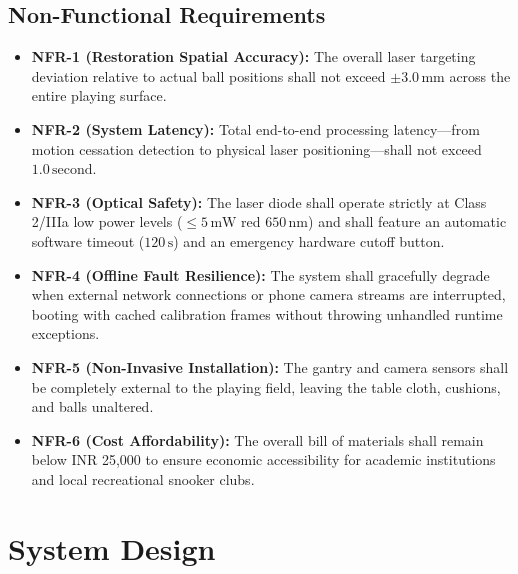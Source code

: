 \subsection{Non-Functional Requirements}
\begin{itemize}
    \item \textbf{NFR-1 (Restoration Spatial Accuracy):} The overall laser targeting deviation relative to actual ball positions shall not exceed $\pm 3.0\,\text{mm}$ across the entire playing surface.
    \item \textbf{NFR-2 (System Latency):} Total end-to-end processing latency---from motion cessation detection to physical laser positioning---shall not exceed $1.0\,\text{second}$.
    \item \textbf{NFR-3 (Optical Safety):} The laser diode shall operate strictly at Class 2/IIIa low power levels ($\le 5\,\text{mW}$ red $650\,\text{nm}$) and shall feature an automatic software timeout ($120\,\text{s}$) and an emergency hardware cutoff button.
    \item \textbf{NFR-4 (Offline Fault Resilience):} The system shall gracefully degrade when external network connections or phone camera streams are interrupted, booting with cached calibration frames without throwing unhandled runtime exceptions.
    \item \textbf{NFR-5 (Non-Invasive Installation):} The gantry and camera sensors shall be completely external to the playing field, leaving the table cloth, cushions, and balls unaltered.
    \item \textbf{NFR-6 (Cost Affordability):} The overall bill of materials shall remain below INR 25,000 to ensure economic accessibility for academic institutions and local recreational snooker clubs.
\end{itemize}

\section{System Design}

